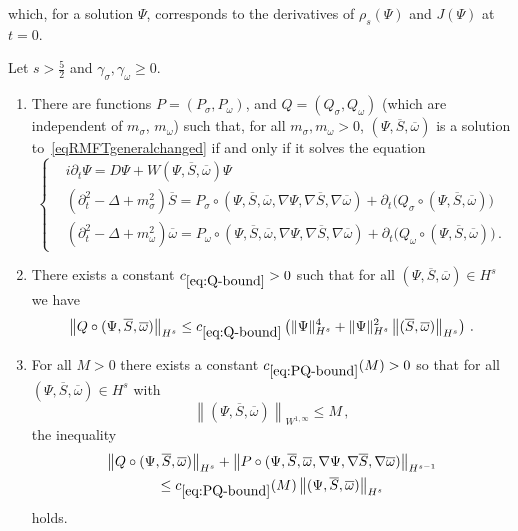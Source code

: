 \documentclass[AHL,Unicode,longabstracts,published]{cedram}
\newcommand*{\romanenumi}{\renewcommand*{\theenumi}{\roman{enumi}}}
\begin{document}
which, for a solution $\Psi$, corresponds to the derivatives of $\rho_s(\Psi)$ and $J(\Psi)$ at $t=0$.

\begin{lemm}\label{lem.red-eq}
Let $s>\tfrac52$ and $\gamma_\sigma, \gamma_\omega\geq 0$.
\begin{enumerate}\romanenumi
\item There are functions $P=(P_\sigma,P_\omega)$, and $Q=(Q_\sigma, Q_\omega)$ (which are independent of $m_\sigma$, $m_\omega$) such that, for all $m_\sigma, m_\omega>0$, $(\Psi,\overline{S},\overline{\omega})$ is a solution to~\eqref{eqRMFTgeneralchanged} if and only if it solves the equation
\begin{equation}\label{eqRMFT-PQ}
\begin{cases}
&i\partial_t \Psi=D \Psi + W(\Psi, \overline{S}, \overline{\omega}) \Psi \\
&\left(\partial_t^2-\Delta + m_\sigma^2\right)\overline{S} = P_\sigma\circ (\Psi, \overline{S}, \overline{\omega}, \nabla\Psi, \nabla \overline{S}, \nabla \overline{\omega}) + \partial_t \big(Q_\sigma\circ (\Psi, \overline{S}, \overline{\omega})\big)\\
&(\partial_t^2-\Delta + m_\omega^2)\overline{\omega} = P_\omega\circ (\Psi, \overline{S}, \overline{\omega}, \nabla\Psi, \nabla \overline{S}, \nabla \overline{\omega}) + \partial_t \big(Q_\omega\circ(\Psi, \overline{S}, \overline{\omega})\big)\,.
\end{cases}
\end{equation}
\item There exists a constant $c_{\eqref{eq:Q-bound}}>0$ such that for all $(\Psi,\overline{S}, \overline{\omega})\in H^s$ we have
\begin{equation}\label{eq:Q-bound}
\left\| Q\circ(\Psi,\overline{S}, \overline{\omega})\right\|_{H^s} \leq c_{\eqref{eq:Q-bound}} \left(\|\Psi\|^4_{H^{s}} + \|\Psi\|^2_{H^{s}} \left\|(\overline{S}, \overline{\omega})\right\|_{H^s}\right)\,.
\end{equation}
\item For all $M>0$ there exists a constant $c_{\eqref{eq:PQ-bound}}(M)>0$ so that for all $(\Psi,\overline{S}, \overline{\omega})\in H^s$ with
\begin{equation*}
\left\|(\Psi,\overline{S}, \overline{\omega})\right\|_{W^{1,\infty}} \leq M\,,
\end{equation*}
the inequality
\begin{multline}\label{eq:PQ-bound}
\left\| Q \circ(\Psi,\overline{S}, \overline{\omega})\right\|_{H^s} +\left\| P\circ(\Psi, \overline{S}, \overline{\omega}, \nabla\Psi, \nabla \overline{S}, \nabla \overline{\omega})\right\|_{H^{s-1}}\\
\leq c_{\eqref{eq:PQ-bound}}(M) \left\|(\Psi,\overline{S}, \overline{\omega})\right\|_{H^{s}}
\end{multline}
holds.
\end{enumerate}
\end{lemm}
\end{document}
